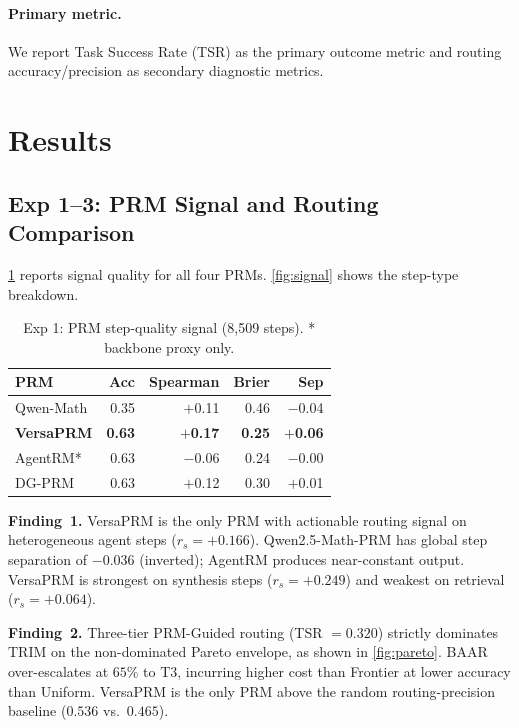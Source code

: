 \documentclass[sigconf,natbib=false]{acmart}
\begin{document}
\paragraph{Primary metric.}
We report Task Success Rate (TSR) as the primary outcome metric and routing
accuracy/precision as secondary diagnostic metrics.

\section{Results}

\subsection{Exp 1--3: PRM Signal and Routing Comparison}
\label{sec:exp1}

\cref{tab:exp1} reports signal quality for all four PRMs.  \cref{fig:signal}
shows the step-type breakdown.

\begin{table}[h]
\small
\centering
\caption{Exp 1: PRM step-quality signal (8,509 steps). * backbone proxy only.}
\label{tab:exp1}
\begin{tabular}{lrrrr}
\toprule
PRM & Acc & Spearman & Brier & Sep \\
\midrule
Qwen-Math & 0.35 & $+$0.11 & 0.46 & $-$0.04 \\
\textbf{VersaPRM} & \textbf{0.63} & \textbf{$+$0.17} & \textbf{0.25} & \textbf{$+$0.06} \\
AgentRM*  & 0.63 & $-$0.06 & 0.24 & $-$0.00 \\
DG-PRM    & 0.63 & $+$0.12 & 0.30 & $+$0.01 \\
\bottomrule
\end{tabular}
\end{table}

\textbf{Finding~1.}  VersaPRM is the only PRM with actionable routing signal
on heterogeneous agent steps ($r_s = +0.166$).  Qwen2.5-Math-PRM has global
step separation of $-0.036$ (inverted); AgentRM produces near-constant output.
VersaPRM is strongest on synthesis steps ($r_s = +0.249$) and weakest on
retrieval ($r_s = +0.064$).

\textbf{Finding~2.}  Three-tier PRM-Guided routing (TSR $= 0.320$) strictly
dominates TRIM on the non-dominated Pareto envelope, as shown in
\cref{fig:pareto}.  BAAR over-escalates at $65\%$ to T3, incurring higher cost
than Frontier at lower accuracy than Uniform.  VersaPRM is the only PRM above
the random routing-precision baseline ($0.536$ vs.\ $0.465$).
\end{document}
